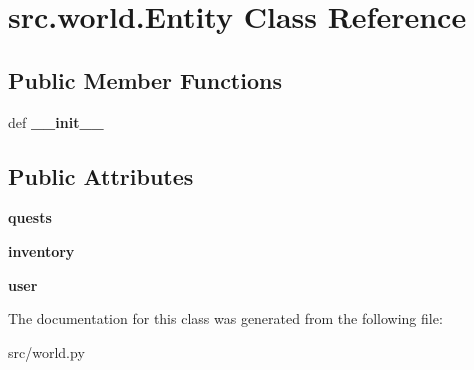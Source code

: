 \hypertarget{classsrc_1_1world_1_1_entity}{\section{src.\-world.\-Entity \-Class \-Reference}
\label{classsrc_1_1world_1_1_entity}
}
\subsection*{\-Public \-Member \-Functions}
\begin{DoxyCompactItemize}
\item 
\hypertarget{classsrc_1_1world_1_1_entity_a4a2c20fa15aa06f416b783bdd8969a70}{def {\bfseries \-\_\-\-\_\-init\-\_\-\-\_\-}}\label{classsrc_1_1world_1_1_entity_a4a2c20fa15aa06f416b783bdd8969a70}

\end{DoxyCompactItemize}
\subsection*{\-Public \-Attributes}
\begin{DoxyCompactItemize}
\item 
\hypertarget{classsrc_1_1world_1_1_entity_aa2aed1efbc5157f11890fe04f45980b5}{{\bfseries quests}}\label{classsrc_1_1world_1_1_entity_aa2aed1efbc5157f11890fe04f45980b5}

\item 
\hypertarget{classsrc_1_1world_1_1_entity_a22798645d6cc02ddb409797677f51f5f}{{\bfseries inventory}}\label{classsrc_1_1world_1_1_entity_a22798645d6cc02ddb409797677f51f5f}

\item 
\hypertarget{classsrc_1_1world_1_1_entity_a10c803f10b0108e945b6c569ce175469}{{\bfseries user}}\label{classsrc_1_1world_1_1_entity_a10c803f10b0108e945b6c569ce175469}

\end{DoxyCompactItemize}


\-The documentation for this class was generated from the following file\-:\begin{DoxyCompactItemize}
\item 
src/world.\-py\end{DoxyCompactItemize}
